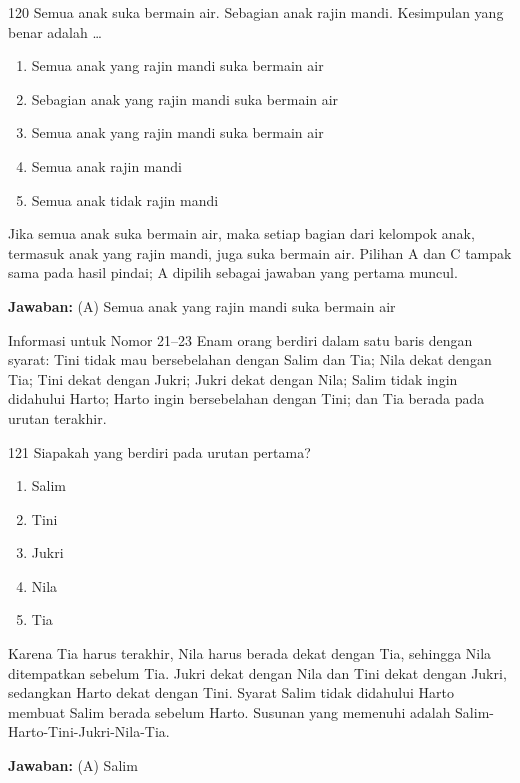 \documentclass[11pt]{article}
\newenvironment{pil}{\begin{enumerate}[label=(\Alph*),leftmargin=*,itemsep=1pt,topsep=3pt]}{\end{enumerate}}
\newcommand{\jw}[1]{\par\smallskip\begin{jawbox}\textbf{Jawaban:} #1\end{jawbox}}
\begin{document}
\begin{soalbox}{1}{20}
Semua anak suka bermain air. Sebagian anak rajin mandi. Kesimpulan yang benar adalah \ldots
\begin{pil}\item Semua anak yang rajin mandi suka bermain air \item Sebagian anak yang rajin mandi suka bermain air \item Semua anak yang rajin mandi suka bermain air \item Semua anak rajin mandi \item Semua anak tidak rajin mandi\end{pil}
\end{soalbox}
\begin{pembox}
Jika semua anak suka bermain air, maka setiap bagian dari kelompok anak, termasuk anak yang rajin mandi, juga suka bermain air. Pilihan A dan C tampak sama pada hasil pindai; A dipilih sebagai jawaban yang pertama muncul.
\jw{(A) Semua anak yang rajin mandi suka bermain air}
\end{pembox}

\begin{infobox}{Informasi untuk Nomor 21--23}
Enam orang berdiri dalam satu baris dengan syarat: Tini tidak mau bersebelahan dengan Salim dan Tia; Nila dekat dengan Tia; Tini dekat dengan Jukri; Jukri dekat dengan Nila; Salim tidak ingin didahului Harto; Harto ingin bersebelahan dengan Tini; dan Tia berada pada urutan terakhir.
\end{infobox}

\begin{soalbox}{1}{21}
Siapakah yang berdiri pada urutan pertama?
\begin{pil}\item Salim \item Tini \item Jukri \item Nila \item Tia\end{pil}
\end{soalbox}
\begin{pembox}
Karena Tia harus terakhir, Nila harus berada dekat dengan Tia, sehingga Nila ditempatkan sebelum Tia. Jukri dekat dengan Nila dan Tini dekat dengan Jukri, sedangkan Harto dekat dengan Tini. Syarat Salim tidak didahului Harto membuat Salim berada sebelum Harto. Susunan yang memenuhi adalah Salim-Harto-Tini-Jukri-Nila-Tia.
\jw{(A) Salim}
\end{pembox}
\end{document}
